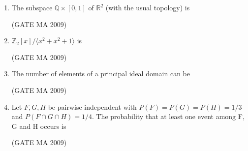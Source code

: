 \documentclass[journal,12pt,onecolumn]{IEEEtran}
\theoremstyle{remark}
\begin{document}
\begin{enumerate}
\item The subspace $\mathbb{Q}\times[0,1]$ of $\mathbb{R}^2$ (with the usual topology) is
\begin{enumerate}
\end{enumerate}
\hfill (GATE MA 2009)

\item $\mathbb{Z}_2[x]/\langle x^2 + x^2 + 1\rangle$ is
\begin{enumerate}
\end{enumerate}
\hfill (GATE MA 2009)

\item The number of elements of a principal ideal domain can be
\begin{enumerate}
\end{enumerate}
\hfill (GATE MA 2009)

\item Let $F, G, H$ be pairwise independent with $P(F)=P(G)=P(H)=1/3$ and $P(F\cap G\cap H)=1/4$. The probability that at least one event among F, G and H occurs is
\begin{enumerate}
\end{enumerate}
\hfill (GATE MA 2009)


\end{enumerate}
\end{document}
